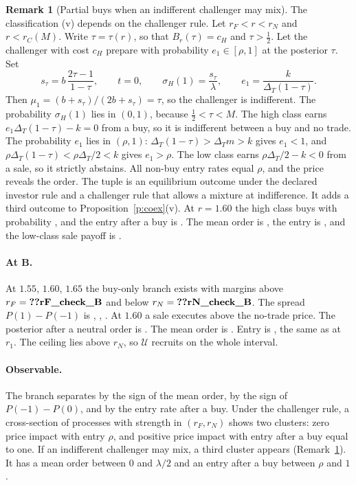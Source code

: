 \documentclass[12pt]{article}
\theoremstyle{definition}
\newtheorem{remark}{Remark}
\newcommand{\cH}{c_H}
\begin{document}
\begin{remark}[Partial buys when an indifferent challenger may mix]\label{r:mix}
The classification (v) depends on the challenger rule.
Let $r_F<r<r_N$ and $r<r_C(M)$.
Write $\tau=\tau(r)$, so that $B_r(\tau)=\cH$ and $\tau>\tfrac12$.
Let the challenger with cost $\cH$ prepare with probability $e_1\in[\rho,1]$ at the posterior $\tau$.
Set
\[
s_\tau=b\,\frac{2\tau-1}{1-\tau},\qquad t=0,\qquad \sigma_H(1)=\frac{s_\tau}{\lambda},\qquad e_1=\frac{k}{\Delta_T(1-\tau)} .
\]
Then $\mu_1=(b+s_\tau)/(2b+s_\tau)=\tau$, so the challenger is indifferent.
The probability $\sigma_H(1)$ lies in $(0,1)$, because $\tfrac12<\tau<M$.
The high class earns $e_1\Delta_T(1-\tau)-k=0$ from a buy, so it is indifferent between a buy and no trade.
The probability $e_1$ lies in $(\rho,1)$: $\Delta_T(1-\tau)>\Delta_T m>k$ gives $e_1<1$, and $\rho\Delta_T(1-\tau)<\rho\Delta_T/2<k$ gives $e_1>\rho$.
The low class earns $\rho\Delta_T/2-k<0$ from a sale, so it strictly abstains.
All non-buy entry rates equal $\rho$, and the price reveals the order.
The tuple is an equilibrium outcome under the declared investor rule and a challenger rule that allows a mixture at indifference.
It adds a third outcome to Proposition~\ref{p:coex}(v).
At $r=1.60$ the high class buys with probability , and the entry after a buy is .
The mean order is , the entry is , and the low-class sale payoff is .
\end{remark}

\paragraph{At B.}
At $1.55$, $1.60$, $1.65$ the buy-only branch exists with margins  above $r_F=\reg{rF_check_B}$ and  below $r_N=\reg{rN_check_B}$.
The spread $P(1)-P(-1)$ is , , .
At $1.60$ a sale executes  above the no-trade price.
The posterior after a neutral order is .
The mean order is .
Entry is , the same as at $r_1$.
The ceiling lies  above $r_N$, so $\mathcal U$ recruits on the whole interval.

\paragraph{Observable.}
The branch separates by the sign of the mean order, by the sign of $P(-1)-P(0)$, and by the entry rate after a buy.
Under the challenger rule, a cross-section of processes with strength in $(r_F,r_N)$ shows two clusters: zero price impact with entry $\rho$, and positive price impact with entry after a buy equal to one.
If an indifferent challenger may mix, a third cluster appears (Remark~\ref{r:mix}).
It has a mean order between $0$ and $\lambda/2$ and an entry after a buy between $\rho$ and $1$.
\end{document}
